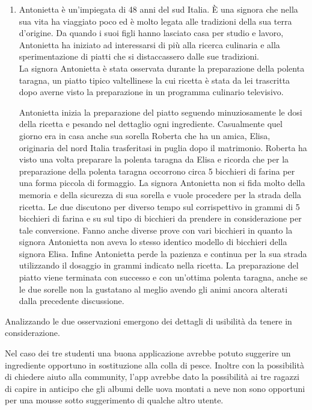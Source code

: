 \begin{enumerate}
\item Antonietta è un'impiegata di 48 anni del sud Italia. È una signora che
nella sua vita ha viaggiato poco ed è molto legata alle tradizioni della
sua terra d'origine. Da quando i suoi figli hanno lasciato casa per
studio e lavoro, Antonietta ha iniziato ad interessarsi di più alla
ricerca culinaria e alla sperimentazione di piatti che si distaccassero
dalle sue tradizioni.\\

La signora Antonietta è stata osservata durante la preparazione della polenta taragna, un
piatto tipico valtellinese la cui ricetta è stata da lei trascritta dopo
averne visto la preparazione in un programma culinario televisivo.

Antonietta inizia la preparazione del piatto seguendo minuziosamente le
dosi della ricetta e pesando nel dettaglio ogni ingrediente. Casualmente
quel giorno era in casa anche sua sorella Roberta che ha un amica,
Elisa, originaria del nord Italia trasferitasi in puglia dopo il matrimonio.
Roberta ha visto una volta preparare la polenta taragna da Elisa e
ricorda che per la preparazione della polenta taragna occorrono circa 5
bicchieri di farina per una forma piccola di formaggio. La signora
Antonietta non si fida molto della memoria e della sicurezza di sua sorella
e vuole procedere per la strada della ricetta. Le due discutono per
diverso tempo sul corrispettivo in grammi di 5 bicchieri di farina e su
sul tipo di bicchieri da prendere in considerazione per tale
conversione. Fanno anche diverse prove con vari bicchieri in quanto la
signora Antonietta non aveva lo stesso identico modello di bicchieri della
signora Elisa. Infine Antonietta perde la pazienza e continua per la sua
strada utilizzando il dosaggio in grammi indicato nella ricetta. La
preparazione del piatto viene terminata con successo e con un'ottima
polenta taragna, anche se le due sorelle non la gustatano al meglio avendo
gli animi ancora alterati dalla precedente discussione.
\end{enumerate}

Analizzando le due osservazioni emergono dei dettagli di usibilità da
tenere in considerazione.

Nel caso dei tre studenti una buona
applicazione avrebbe potuto suggerire un ingrediente opportuno in
sostituzione alla colla di pesce. Inoltre con la possibilità di chiedere
aiuto alla community, l'app avrebbe dato la possibilità ai tre ragazzi di capire in
anticipo che gli albumi delle uova montati a neve non sono opportuni per
una mousse sotto suggerimento di qualche altro utente.

